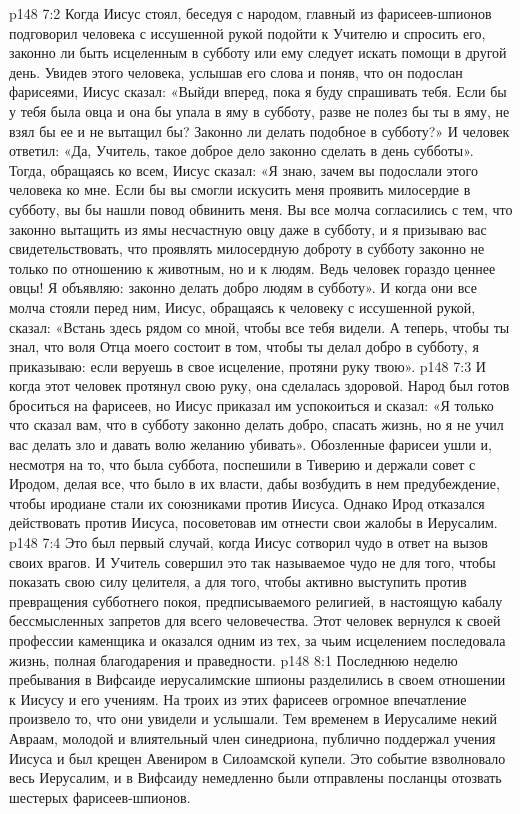 \vs p148 7:2 Когда Иисус стоял, беседуя с народом, главный из фарисеев\hyp{}шпионов подговорил человека с иссушенной рукой подойти к Учителю и спросить его, законно ли быть исцеленным в субботу или ему следует искать помощи в другой день. Увидев этого человека, услышав его слова и поняв, что он подослан фарисеями, Иисус сказал: «Выйди вперед, пока я буду спрашивать тебя. Если бы у тебя была овца и она бы упала в яму в субботу, разве не полез бы ты в яму, не взял бы ее и не вытащил бы? Законно ли делать подобное в субботу?» И человек ответил: «Да, Учитель, такое доброе дело законно сделать в день субботы». Тогда, обращаясь ко всем, Иисус сказал: «Я знаю, зачем вы подослали этого человека ко мне. Если бы вы смогли искусить меня проявить милосердие в субботу, вы бы нашли повод обвинить меня. Вы все молча согласились с тем, что законно вытащить из ямы несчастную овцу даже в субботу, и я призываю вас свидетельствовать, что проявлять милосердную доброту в субботу законно не только по отношению к животным, но и к людям. Ведь человек гораздо ценнее овцы! Я объявляю: законно делать добро людям в субботу». И когда они все молча стояли перед ним, Иисус, обращаясь к человеку с иссушенной рукой, сказал: «Встань здесь рядом со мной, чтобы все тебя видели. А теперь, чтобы ты знал, что воля Отца моего состоит в том, чтобы ты делал добро в субботу, я приказываю: если веруешь в свое исцеление, протяни руку твою».
\vs p148 7:3 И когда этот человек протянул свою руку, она сделалась здоровой. Народ был готов броситься на фарисеев, но Иисус приказал им успокоиться и сказал: «Я только что сказал вам, что в субботу законно делать добро, спасать жизнь, но я не учил вас делать зло и давать волю желанию убивать». Обозленные фарисеи ушли и, несмотря на то, что была суббота, поспешили в Тиверию и держали совет с Иродом, делая все, что было в их власти, дабы возбудить в нем предубеждение, чтобы иродиане стали их союзниками против Иисуса. Однако Ирод отказался действовать против Иисуса, посоветовав им отнести свои жалобы в Иерусалим.
\vs p148 7:4 Это был первый случай, когда Иисус сотворил чудо в ответ на вызов своих врагов. И Учитель совершил это так называемое чудо не для того, чтобы показать свою силу целителя, а для того, чтобы активно выступить против превращения субботнего покоя, предписываемого религией, в настоящую кабалу бессмысленных запретов для всего человечества. Этот человек вернулся к своей профессии каменщика и оказался одним из тех, за чьим исцелением последовала жизнь, полная благодарения и праведности.
\vs p148 8:1 Последнюю неделю пребывания в Вифсаиде иерусалимские шпионы разделились в своем отношении к Иисусу и его учениям. На троих из этих фарисеев огромное впечатление произвело то, что они увидели и услышали. Тем временем в Иерусалиме некий Авраам, молодой и влиятельный член синедриона, публично поддержал учения Иисуса и был крещен Авениром в Силоамской купели. Это событие взволновало весь Иерусалим, и в Вифсаиду немедленно были отправлены посланцы отозвать шестерых фарисеев\hyp{}шпионов.

